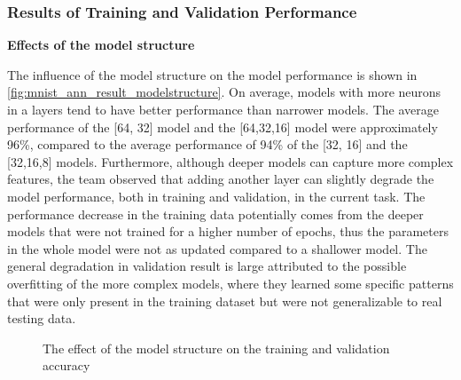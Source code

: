 \documentclass[a4paper]{article}
\begin{document}
\subsubsection{Results of Training and Validation Performance} \label{ann_model_result_hyperparameter}
\textbf{Effects of the model structure}

The influence of the model structure on the model performance is shown in \autoref{fig:mnist_ann_result_modelstructure}. On average, models with more neurons in a layers tend to have better performance than narrower models. The average performance of the [64, 32] model and the [64,32,16] model were approximately 96\%, compared to the average performance of 94\% of the [32, 16] and the [32,16,8] models. Furthermore, although deeper models can capture more complex features, the team observed that adding another layer can slightly degrade the model performance, both in training and validation, in the current task. The performance decrease in the training data potentially comes from the deeper models that were not trained for a higher number of epochs, thus the parameters in the whole model were not as updated compared to a shallower model. The general degradation in validation result is large attributed to the possible overfitting of the more complex models, where they learned some specific patterns that were only present in the training dataset but were not generalizable to real testing data.

\begin{figure} [h!]
    \caption{The effect of the model structure on the training and validation accuracy} 
    \label{fig:mnist_ann_result_modelstructure}
\end{figure}
\end{document}
